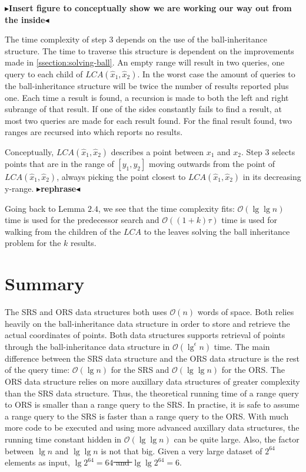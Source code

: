 \documentclass[twoside,11pt,openright]{report}
\newcommand{\todo}[1]{{\color[rgb]{.5,0,0}\textbf{$\blacktriangleright$#1$\blacktriangleleft$}}}
\providecommand{\DIFadd}[1]{{\protect\color{blue}\uwave{#1}}} %
\providecommand{\DIFdel}[1]{{\protect\color{red}\sout{#1}}}                      %
\providecommand{\DIFaddbegin}{} %
\providecommand{\DIFaddend}{} %
\providecommand{\DIFdelbegin}{} %
\providecommand{\DIFdelend}{} %
\begin{document}
\todo{Insert figure to conceptually show we are working our way out from the inside}

The time complexity of step $3$ depends on the use of the ball-inheritance structure. The time to traverse this structure is dependent on the improvements made in \ref{ssection:solving-ball}. An empty range will result in two queries, one query to each child of $LCA(\hat{x}_1, \hat{x}_2)$. In the worst case the amount of queries to the ball-inheritance structure will be twice the number of results reported plus one. Each time a result is found, a recursion is made to both the left and right subrange of that result. If one of the sides constantly fails to find a result, at most two queries are made for each result found. For the final result found, two ranges are recursed into which reports no results.

Conceptually, $LCA(\hat{x}_1, \hat{x}_2)$ describes a point between $x_1$ and $x_2$. Step $3$ selects points that are in the range of $[y_1, y_2]$ moving outwards from the point of $LCA(\hat{x}_1, \hat{x}_2)$, always picking the point closest to $LCA(\hat{x}_1, \hat{x}_2)$ in its decreasing y-range. \todo{rephrase}

Going back to Lemma $2.4$, we see that the time complexity fits: $\mathcal{O}(\lg \lg n)$ time is used for the predecessor search and $\mathcal{O}((1+k)\tau)$ time is used for walking from the children of the $LCA$ to the leaves solving the ball inheritance problem for the $k$ results.

\section{Summary}
\label{sect:summaryprim}

The SRS and ORS data structures both uses $\mathcal{O}(n)$ words of space. Both relies heavily on the ball-inheritance data structure in order to store and retrieve the actual coordinates of points. Both data structures supports retrieval of points through the ball-inheritance data structure in $\mathcal{O}(\lg^\epsilon n)$ time. The main difference between the SRS data structure and the ORS data structure is the rest of the query time: $\mathcal{O}(\lg n)$ for the SRS and $\mathcal{O}(\lg \lg n)$ for the ORS. The ORS data structure relies on more auxillary data structures of greater complexity than the SRS data structure. Thus, the theoretical running time of a range query to ORS is smaller than a range query to the SRS. In practise, it is safe to assume a range query to the SRS is faster than a range query to the ORS. With much more code to be executed and using more advanced auxillary data structures, the running time constant hidden in $\mathcal{O}(\lg \lg n)$ can be quite large. Also,  the factor between $\lg n$ and $\lg \lg n$ is not that big. Given a very large dataset of \DIFdelbegin \DIFdel{$2^64$ }\DIFdelend \DIFaddbegin \DIFadd{$2^{64}$ }\DIFaddend elements as input, \DIFdelbegin \DIFdel{$\lg 2^64 = 64$ and $\lg \lg 2^64 = 6$}\DIFdelend \DIFaddbegin \DIFadd{$\lg 2^{64} = 64$ and $\lg \lg 2^{64} = 6$, which has a factor $\sim10$ difference}\DIFaddend . \\
\end{document}
